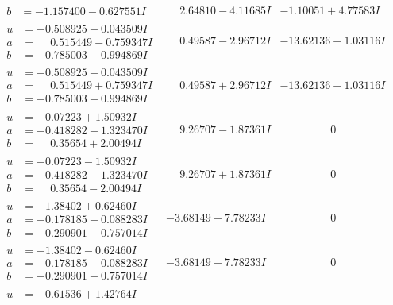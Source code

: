 \documentclass[1p]{elsarticle_modified}
\theoremstyle{definition}
\begin{document}
$$\begin{array}{c|c|c}
\begin{aligned}
b &= -1.157400 - 0.627551 I\end{aligned}
 & \phantom{-}2.64810 - 4.11685 I & -1.10051 + 4.77583 I \\ \hline\begin{aligned}
u &= -0.508925 + 0.043509 I \\
a &= \phantom{-}0.515449 - 0.759347 I \\
b &= -0.785003 - 0.994869 I\end{aligned}
 & \phantom{-}0.49587 - 2.96712 I & -13.62136 + 1.03116 I \\ \hline\begin{aligned}
u &= -0.508925 - 0.043509 I \\
a &= \phantom{-}0.515449 + 0.759347 I \\
b &= -0.785003 + 0.994869 I\end{aligned}
 & \phantom{-}0.49587 + 2.96712 I & -13.62136 - 1.03116 I \\ \hline\begin{aligned}
u &= -0.07223 + 1.50932 I \\
a &= -0.418282 - 1.323470 I \\
b &= \phantom{-}0.35654 + 2.00494 I\end{aligned}
 & \phantom{-}9.26707 - 1.87361 I & \phantom{-0.000000 } 0 \\ \hline\begin{aligned}
u &= -0.07223 - 1.50932 I \\
a &= -0.418282 + 1.323470 I \\
b &= \phantom{-}0.35654 - 2.00494 I\end{aligned}
 & \phantom{-}9.26707 + 1.87361 I & \phantom{-0.000000 } 0 \\ \hline\begin{aligned}
u &= -1.38402 + 0.62460 I \\
a &= -0.178185 + 0.088283 I \\
b &= -0.290901 - 0.757014 I\end{aligned}
 & -3.68149 + 7.78233 I & \phantom{-0.000000 } 0 \\ \hline\begin{aligned}
u &= -1.38402 - 0.62460 I \\
a &= -0.178185 - 0.088283 I \\
b &= -0.290901 + 0.757014 I\end{aligned}
 & -3.68149 - 7.78233 I & \phantom{-0.000000 } 0 \\ \hline\begin{aligned}
u &= -0.61536 + 1.42764 I \\

\end{aligned}
\end{array}$$
\end{document}
